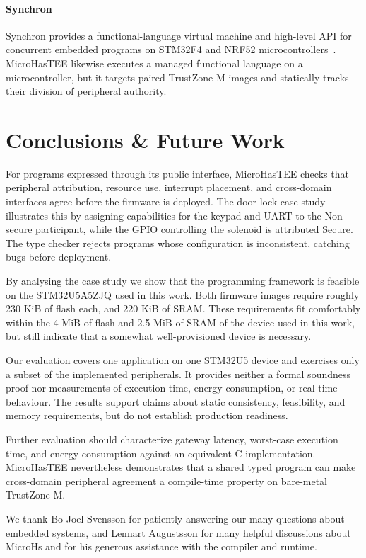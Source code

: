 \documentclass[sigconf]{acmart}
\begin{document}
\paragraph{Synchron}
Synchron provides a functional-language virtual machine and high-level API for concurrent embedded programs on STM32F4 and NRF52 microcontrollers~\cite{DBLP:conf/ecoop/SarkarSS22}.
MicroHasTEE likewise executes a managed functional language on a microcontroller, but it targets paired TrustZone-M images and statically tracks their division of peripheral authority.

\section{Conclusions \& Future Work}

For programs expressed through its public interface, MicroHasTEE checks that peripheral attribution, resource use, interrupt placement, and cross-domain interfaces agree before the firmware is deployed.
The door-lock case study illustrates this by assigning capabilities for the keypad and UART to the Non-secure participant, while the GPIO controlling the solenoid is attributed Secure.
The type checker rejects programs whose configuration is inconsistent, catching bugs before deployment.

By analysing the case study we show that the programming framework is feasible on the STM32U5A5ZJQ used in this work.
Both firmware images require roughly 230 KiB of flash each, and 220 KiB of SRAM.
These requirements fit comfortably within the 4 MiB of flash and 2.5 MiB of SRAM of the device used in this work, but still indicate that a somewhat well-provisioned device is necessary.

Our evaluation covers one application on one STM32U5 device and exercises only a subset of the implemented peripherals.
It provides neither a formal soundness proof nor measurements of execution time, energy consumption, or real-time behaviour.
The results support claims about static consistency, feasibility, and memory requirements, but do not establish production readiness.

Further evaluation should characterize gateway latency, worst-case execution time, and energy consumption against an equivalent C implementation.
MicroHasTEE nevertheless demonstrates that a shared typed program can make cross-domain peripheral agreement a compile-time property on bare-metal TrustZone-M.

\begin{acks}
  We thank Bo Joel Svensson for patiently answering our many questions about embedded systems, and Lennart Augustsson for many helpful discussions about MicroHs and for his generous assistance with the compiler and runtime.
\end{acks}





\appendix
\end{document}
